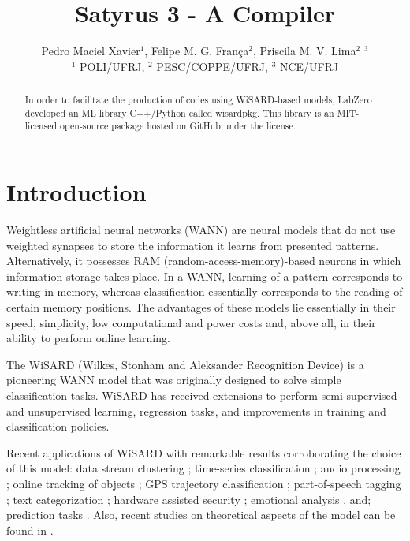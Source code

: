 \documentclass[12pt]{article}
\title{Satyrus 3 - A Compiler}
\author{Pedro Maciel Xavier$^1$, Felipe M. G. Fran\c{c}a$^2$, Priscila M. V. Lima$^2$ $^3$\\
$^1$ POLI/UFRJ, $^2$ PESC/COPPE/UFRJ, $^3$ NCE/UFRJ}
\begin{document}
\nocite{*}

\maketitle

\begin{abstract}
    In order to facilitate the production of codes using WiSARD-based models, LabZero developed an ML library C++/Python called wisardpkg. This library is an MIT-licensed open-source package hosted on GitHub under the license.
\end{abstract}

\section{Introduction}

Weightless  artificial  neural  networks  (WANN)  are  neural  models
that  do  not  use weighted synapses to store the information it learns from presented patterns. Alternatively, it possesses RAM (random-access-memory)-based neurons in which information storage takes place. In a WANN, learning of a pattern corresponds to writing in memory, whereas classification essentially corresponds to the reading of certain memory positions. The advantages of these models lie essentially in their speed, simplicity, low computational and power costs and, above all, in their ability to perform online learning.

The WiSARD (Wilkes, Stonham and Aleksander Recognition Device) \cite{aleksander} is a pioneering WANN model that was originally designed to solve simple classification tasks. WiSARD has received extensions to perform semi-supervised and unsupervised learning, regression tasks, and improvements in training and classification policies.

Recent applications of WiSARD with remarkable results corroborating the choice of this model: data stream clustering \cite{douglas, douglas2, douglas3}; time-series classification \cite{souza2014}; audio processing \cite{souza2015}; online tracking of objects \cite{nascimento2015}; GPS trajectory classification \cite{barbosa2018}; part-of-speech tagging \cite{carneiro2015, carneiro2017}; text categorization \cite{rangel2016}; hardware assisted security \cite{santiago2019}; emotional analysis \cite{vidal2013, lusquinofilho2018, aus, empathy}, and; prediction tasks \cite{rew, lusquino2020}. Also, recent studies on theoretical aspects of the model can be found in \cite{carneiro2019}. 
\end{document}
